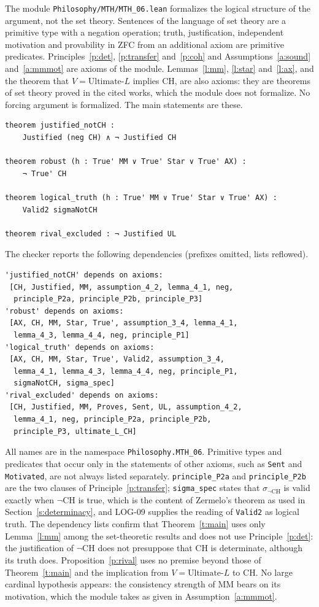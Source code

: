 \documentclass{situationist-preprint}
\begin{document}
The module \nolinkurl{Philosophy/MTH/MTH_06.lean} formalizes the logical structure of the argument, not the set theory. Sentences of the language of set theory are a primitive type with a negation operation; truth, justification, independent motivation and provability in ZFC from an additional axiom are primitive predicates. Principles~\ref{p:det}, \ref{p:transfer} and~\ref{p:coh} and Assumptions~\ref{a:sound} and~\ref{a:mmmot} are axioms of the module. Lemmas~\ref{l:mm}, \ref{l:star} and~\ref{l:ax}, and the theorem that $V = \text{Ultimate-}L$ implies CH, are also axioms: they are theorems of set theory proved in the cited works, which the module does not formalize. No forcing argument is formalized. The main statements are these.

\begin{lstlisting}
theorem justified_notCH :
    Justified (neg CH) ∧ ¬ Justified CH

theorem robust (h : True' MM ∨ True' Star ∨ True' AX) :
    ¬ True' CH

theorem logical_truth (h : True' MM ∨ True' Star ∨ True' AX) :
    Valid2 sigmaNotCH

theorem rival_excluded : ¬ Justified UL
\end{lstlisting}

\noindent The checker reports the following dependencies (prefixes omitted, lists reflowed).

\begin{lstlisting}
'justified_notCH' depends on axioms:
 [CH, Justified, MM, assumption_4_2, lemma_4_1, neg,
  principle_P2a, principle_P2b, principle_P3]
'robust' depends on axioms:
 [AX, CH, MM, Star, True', assumption_3_4, lemma_4_1,
  lemma_4_3, lemma_4_4, neg, principle_P1]
'logical_truth' depends on axioms:
 [AX, CH, MM, Star, True', Valid2, assumption_3_4,
  lemma_4_1, lemma_4_3, lemma_4_4, neg, principle_P1,
  sigmaNotCH, sigma_spec]
'rival_excluded' depends on axioms:
 [CH, Justified, MM, Proves, Sent, UL, assumption_4_2,
  lemma_4_1, neg, principle_P2a, principle_P2b,
  principle_P3, ultimate_L_CH]
\end{lstlisting}

All names are in the namespace \texttt{Philosophy.MTH\_06}. Primitive types and predicates that occur only in the statements of other axioms, such as \texttt{Sent} and \texttt{Motivated}, are not always listed separately. \texttt{principle\_P2a} and \texttt{principle\_P2b} are the two clauses of Principle~\ref{p:transfer}; \texttt{sigma\_spec} states that $\sigma_{\neg\mathrm{CH}}$ is valid exactly when $\neg$CH is true, which is the content of Zermelo's theorem as used in Section~\ref{s:determinacy}, and LOG-09 supplies the reading of \texttt{Valid2} as logical truth. The dependency lists confirm that Theorem~\ref{t:main} uses only Lemma~\ref{l:mm} among the set-theoretic results and does not use Principle~\ref{p:det}: the justification of $\neg$CH does not presuppose that CH is determinate, although its truth does. Proposition~\ref{p:rival} uses no premise beyond those of Theorem~\ref{t:main} and the implication from $V = \text{Ultimate-}L$ to CH. No large cardinal hypothesis appears: the consistency strength of MM bears on its motivation, which the module takes as given in Assumption~\ref{a:mmmot}.
\end{document}
